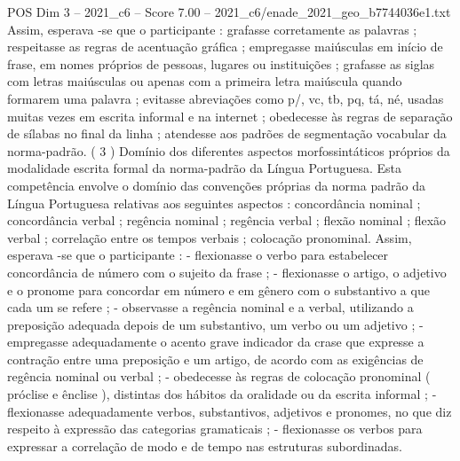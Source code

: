 \begin{textsample}{POS Dim 3 – 2021\_c6 – Score 7.00 – 2021\_c6/enade\_2021\_geo\_b7744036e1.txt}
Assim, esperava -se que o participante : grafasse corretamente as palavras ; respeitasse as regras de acentuação gráfica ; empregasse maiúsculas em início de frase, em nomes próprios de pessoas, lugares ou instituições ; grafasse as siglas com letras maiúsculas ou apenas com a primeira letra maiúscula quando formarem uma palavra ; evitasse abreviações como p/, vc, tb, pq, tá, né, usadas muitas vezes em escrita informal e na internet ; obedecesse às regras de separação de sílabas no final da linha ; atendesse aos padrões de segmentação vocabular da norma-padrão. ( 3 ) Domínio dos diferentes aspectos morfossintáticos próprios da modalidade escrita formal da norma-padrão da Língua Portuguesa.
Esta competência envolve o domínio das convenções próprias da norma padrão da Língua Portuguesa relativas aos seguintes aspectos : concordância nominal ; concordância verbal ; regência nominal ; regência verbal ; flexão nominal ; flexão verbal ; correlação entre os tempos verbais ; colocação pronominal.
Assim, esperava -se que o participante : - flexionasse o verbo para estabelecer concordância de número com o sujeito da frase ; - flexionasse o artigo, o adjetivo e o pronome para concordar em número e em gênero com o substantivo a que cada um se refere ; - observasse a regência nominal e a verbal, utilizando a preposição adequada depois de um substantivo, um verbo ou um adjetivo ; - empregasse adequadamente o acento grave indicador da crase que expresse a contração entre uma preposição e um artigo, de acordo com as exigências de regência nominal ou verbal ; - obedecesse às regras de colocação pronominal ( próclise e ênclise ), distintas dos hábitos da oralidade ou da escrita informal ; - flexionasse adequadamente verbos, substantivos, adjetivos e pronomes, no que diz respeito à expressão das categorias gramaticais ; - flexionasse os verbos para expressar a correlação de modo e de tempo nas estruturas subordinadas.

\end{textsample}
